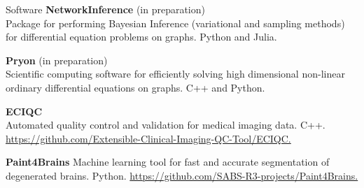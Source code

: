 \begin{rSection}{Software}
{\bf NetworkInference} (in preparation) \\
Package for performing Bayesian Inference (variational and sampling methods) for differential equation problems on graphs. Python and Julia. 

{\bf Pryon} (in preparation) \\
Scientific computing software for efficiently solving high dimensional non-linear ordinary differential equations on graphs. C++ and Python.

{\bf ECIQC} \\
Automated quality control and validation for medical imaging data. C++.  \href{https://github.com/Extensible-Clinical-Imaging-QC-Tool/ECIQC}{https://github.com/Extensible-Clinical-Imaging-QC-Tool/ECIQC.}

{\bf Paint4Brains}
Machine learning tool for fast and accurate segmentation of degenerated brains. Python. \href{https://github.com/SABS-R3-projects/Paint4Brains}{https://github.com/SABS-R3-projects/Paint4Brains.}
\end{rSection}